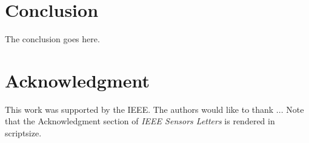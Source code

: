 \documentclass{IEEE_lsens}
\begin{document}
%
%



\section{Conclusion}
The conclusion goes here.



\section*{Acknowledgment}
\scriptsize
This work was supported by the IEEE. The authors would
like to thank ... Note that the Acknowledgment section of
\textit{IEEE Sensors Letters} is rendered in scriptsize.
\end{document}
